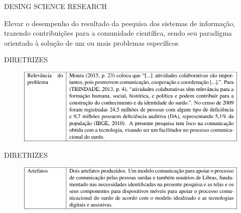 \documentclass{Alexandre}
\begin{document}
\begin{frame}{DESING SCIENCE RESEARCH}
    
    Elevar o desempenho do resultado da pesquisa dos sistemas de informação, trazendo contribuições para a comunidade científica, sendo seu paradigma orientado à solução de um ou mais problemas específicos

\end{frame}


\begin{frame}{DIRETRIZES}
    
    \begin{figure}
        \includegraphics[scale = 0.5]{Figuras/DSR-1.png}
    \end{figure}

\end{frame}


\begin{frame}{DIRETRIZES}
    
    \begin{figure}
        \includegraphics[scale = 0.5]{Figuras/DSR-2.png}
    \end{figure}

\end{frame}
\end{document}
